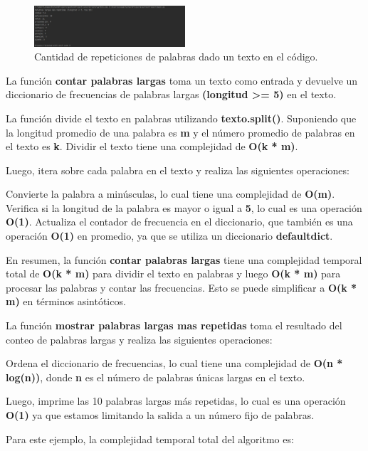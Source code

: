 \documentclass[journal, spanish]{IEEEtran}
\begin{document}
\begin{figure}[H]
  \centering
  \includegraphics[width=0.5\textwidth]{images/IMG-20230913-WA0001.jpg}
  \caption{Cantidad de repeticiones de palabras dado un texto en el código.}
  \label{fig:nombre_de_tu_imagen}
\end{figure}

La función \textbf{contar palabras largas} toma un texto como entrada y devuelve un diccionario de frecuencias de palabras largas \textbf{(longitud >= 5)} en el texto.

La función divide el texto en palabras utilizando \textbf{texto.split()}. Suponiendo que la longitud promedio de una palabra es \textbf{m} y el número promedio de palabras en el texto es \textbf{k}. Dividir el texto tiene una complejidad de \textbf{O(k * m)}.

Luego, itera sobre cada palabra en el texto y realiza las siguientes operaciones:

Convierte la palabra a minúsculas, lo cual tiene una complejidad de \textbf{O(m)}.
Verifica si la longitud de la palabra es mayor o igual a \textbf{5}, lo cual es una operación \textbf{O(1)}.
Actualiza el contador de frecuencia en el diccionario, que también es una operación \textbf{O(1)} en promedio, ya que se utiliza un diccionario \textbf{defaultdict}.

En resumen, la función \textbf{contar palabras largas} tiene una complejidad temporal total de \textbf{O(k * m)} para dividir el texto en palabras y luego \textbf{O(k * m)} para procesar las palabras y contar las frecuencias. Esto se puede simplificar a \textbf{O(k * m)} en términos asintóticos.

La función \textbf{mostrar palabras largas mas repetidas} toma el resultado del conteo de palabras largas y realiza las siguientes operaciones:

Ordena el diccionario de frecuencias, lo cual tiene una complejidad de \textbf{O(n * log(n))}, donde \textbf{n} es el número de palabras únicas largas en el texto.

Luego, imprime las 10 palabras largas más repetidas, lo cual es una operación \textbf{O(1)} ya que estamos limitando la salida a un número fijo de palabras.

Para este ejemplo, la complejidad temporal total del algoritmo es:
\end{document}
